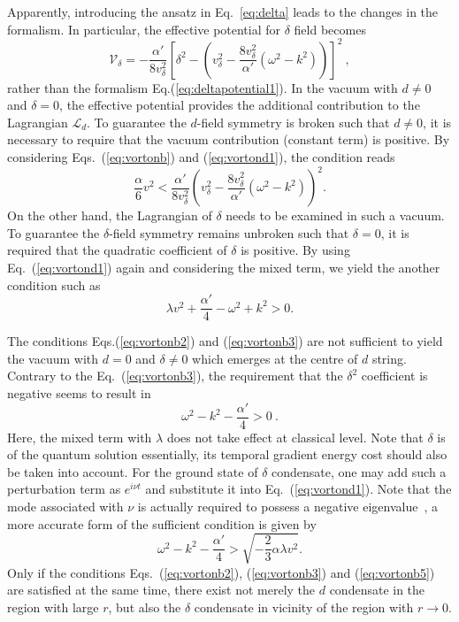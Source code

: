 \documentclass[prd, showpacs,nofootinbib,amsmath,amssymb]{revtex4}
\begin{document}
Apparently, introducing the ansatz in Eq.~\ref{eq:delta} leads to the changes in the formalism.
In particular, the effective potential for $\delta$ field becomes
\begin{equation}
  \label{eq:vortond1}
  \mathcal{V}_\delta= -\frac{\alpha'}{8v_\delta^2} [\delta^2 - (v_\delta^2 - \frac{8v_\delta^2}{\alpha'}(\omega^2 -k^2))]^2 \ ,
\end{equation}
rather than the formalism Eq.(\ref{eq:deltapotential1}).
In the vacuum with $d \neq 0$ and $\delta = 0$, the effective potential provides the additional
contribution to the Lagrangian $\mathcal{L}_d$. To guarantee the $d$-field symmetry is broken such
that $d \neq 0$, it is necessary to require that the vacuum contribution (constant term) is positive.
By considering Eqs.~(\ref{eq:vortonb}) and (\ref{eq:vortond1}), the condition reads
\begin{equation}
\label{eq:vortonb2}
  \frac{\alpha}{6} v^2 < \frac{\alpha'}{8v_\delta^2}(v_\delta^2  - \frac{8v_\delta^2}{\alpha'}(\omega^2 -k^2))^2.
\end{equation}
On the other hand, the Lagrangian of $\delta$ needs to be examined in such a vacuum. To guarantee the
$\delta$-field symmetry remains unbroken such that $\delta = 0$, it is required that the quadratic
coefficient of $\delta$ is positive. By using Eq.~(\ref{eq:vortond1}) again and considering the mixed
term, we yield the another condition such as
\begin{equation}
  \label{eq:vortonb3}
  \lambda v^2 + \frac{\alpha'}{4}- \omega^2 +k^2 > 0.
\end{equation}

The conditions Eqs.(\ref{eq:vortonb2}) and (\ref{eq:vortonb3}) are not sufficient to yield the vacuum
with $d = 0$ and $\delta \neq 0$ which emerges at the centre of $d$ string. Contrary to the
Eq.~(\ref{eq:vortonb3}), the requirement that the $\delta^2$ coefficient is negative seems to result in
\begin{equation}
  \label{eq:vortonb4}
\omega^2 - k^2 -\frac{\alpha'}{4} > 0 \ .
\end{equation}
Here, the mixed term with $\lambda$ does not take effect at classical level. Note that $\delta$ is of
the quantum solution essentially, its temporal gradient energy cost should also be taken into account.
For the ground state of $\delta$ condensate, one may add such a perturbation term as $e^{i\nu t}$ and
substitute it into Eq.~(\ref{eq:vortond1}). Note that the mode associated with $\nu$ is actually required
to possess a negative eigenvalue~\cite{vilenkin2000cosmic,haws1988superconducting}, a more accurate form
of the sufficient condition is given by
\begin{equation}
  \label{eq:vortonb5}
  \omega^2 - k^2 -\frac{\alpha'}{4} > \sqrt{- \frac{2}{3}\alpha \lambda v^2}.
\end{equation}
Only if the conditions Eqs.~(\ref{eq:vortonb2}), (\ref{eq:vortonb3}) and (\ref{eq:vortonb5}) are
satisfied at the same time, there exist not merely the $d$ condensate in the region with large $r$, but
also the $\delta$ condensate in vicinity of the region with $r \rightarrow 0$.
\end{document}
